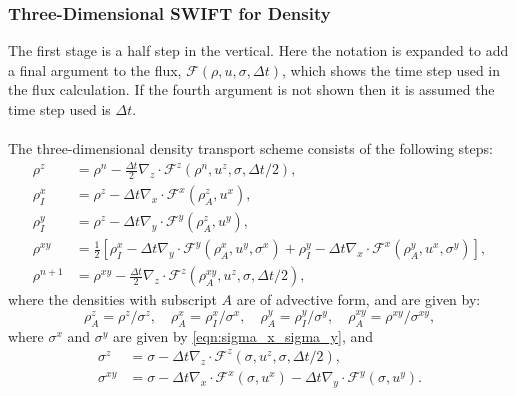 \documentclass{ametsocV6.1}
\begin{document}
\subsubsection{Three-Dimensional SWIFT for Density} \label{sec:3D_density}
The first stage is a half step in the vertical.
Here the notation is expanded to add a final argument to the flux, $\mathcal{F}(\rho,u,\sigma,\Delta{t})$, which shows the time step used in the flux calculation. If the fourth argument is not shown then it is assumed the time step used is $\Delta{t}$. \\
\\
The three-dimensional density transport scheme consists of the following steps:
\begin{subequations}
\begin{align}
\rho^z & = \rho^n - \tfrac{\Delta t}{2}\nabla_z \cdot \mathcal{F}^z\left(\rho^n, u^z, \sigma, \Delta t /2 \right), \\
\rho_I^x & = \rho^z - \Delta t \nabla_x \cdot \mathcal{F}^x\left(\rho^z_A, u^x \right), \\
\rho_I^y & = \rho^z - \Delta t \nabla_y \cdot \mathcal{F}^y\left(\rho^z_A, u^y \right), \\
\rho^{xy} & = \frac{1}{2}\left[\rho_I^x - \Delta t \nabla_y \cdot \mathcal{F}^y\left(\rho^x_A, u^y, \sigma^x \right) + \rho_I^y - \Delta t \nabla_x \cdot \mathcal{F}^x\left(\rho_A^y, u^x,\sigma^y\right)\right], \\
\rho^{n+1} & = \rho^{xy} - \tfrac{\Delta t}{2}\nabla_z\cdot\mathcal{F}^z\left(\rho_A^{xy},u^z,\sigma,\Delta t/2\right),
\end{align}
\end{subequations}
where the densities with subscript $A$ are of advective form, and are given by:
\begin{equation}
\rho^z_A = \rho^z / \sigma^z, \quad
\rho^x_A = \rho_I^x / \sigma^x, \quad
\rho^y_A = \rho_I^y / \sigma^y, \quad
\rho^{xy}_A = \rho^{xy} / \sigma^{xy},
\end{equation}
where $\sigma^x$ and $\sigma^y$ are given by \eqref{eqn:sigma_x_sigma_y}, and
\begin{subequations}
\begin{align}
\sigma^z & = \sigma - \Delta t \nabla_z \cdot \mathcal{F}^z(\sigma,u^z,\sigma,\Delta{t}/2), \\
\sigma^{xy} & = \sigma - \Delta{t} \nabla_x \cdot \mathcal{F}^x(\sigma,u^x) - \Delta{t} \nabla_y \cdot \mathcal{F}^y(\sigma,u^y).
\end{align}
\end{subequations}
\end{document}
